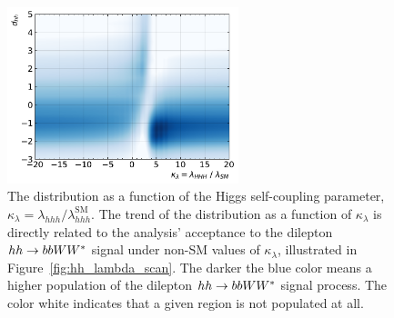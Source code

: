 \begin{figure}[!htb]
    \begin{center}
        \includegraphics[width=0.6\textwidth]{figures/search_hh/results/dhh_vs_lambda}
        \caption{
            The \dhh distribution as a function of the Higgs self-coupling parameter, $\kappa_{\lambda} = \lambda_{hhh} / \lambda_{hhh}^{\text{SM}}$.
            The trend of the \dhh distribution as a function of $\kappa_{\lambda}$ is directly related to the analysis'
            acceptance to the dilepton $hh \rightarrow bbWW^*$ signal under non-SM values of $\kappa_{\lambda}$,
            illustrated in Figure~\ref{fig:hh_lambda_scan}.
            The darker the blue color means a higher population of the dilepton $hh \rightarrow bbWW^*$ signal process.
            The color white indicates that a given region is not populated at all.
        }
        \label{fig:dhh_vs_lambda}
    \end{center}
\end{figure}

